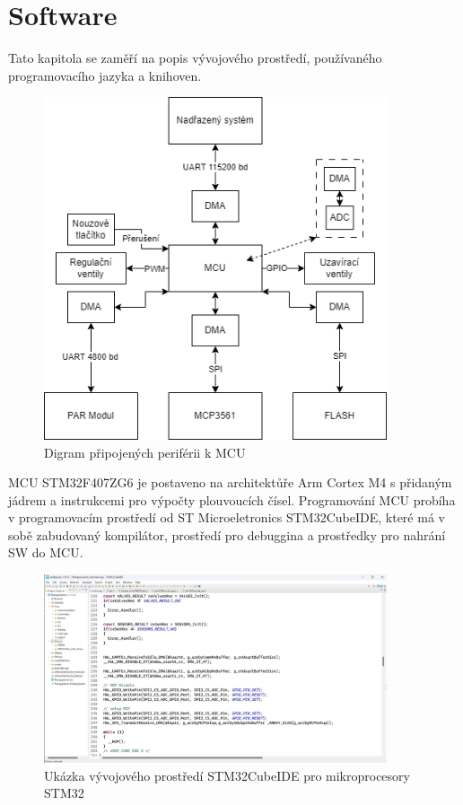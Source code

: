 \chapter{Software}
Tato kapitola se zaměří na popis vývojového prostředí, používaného programovacího jazyka a knihoven.
\begin{figure}[H]
    \label{fig:sw_diagram}
    \caption{Digram připojených periférii k MCU}
    \includegraphics[width=0.9\textwidth]{pictures/sw_diagram.png}
\end{figure}
MCU STM32F407ZG6 je postaveno na architektůře Arm Cortex M4 s přidaným jádrem a instrukcemi pro výpočty plouvoucích čísel.
Programování MCU probíha v programovacím prostředí od ST Microeletronics STM32CubeIDE, které má v sobě zabudovaný kompilátor, prostředí pro debuggina a prostředky pro nahrání SW do MCU.
\begin{figure}[H]
    \caption{Ukázka vývojového prostředí STM32CubeIDE pro mikroprocesory STM32}
    \includegraphics[width=0.9\textwidth]{pictures/cubeide.jpg}
\end{figure}
